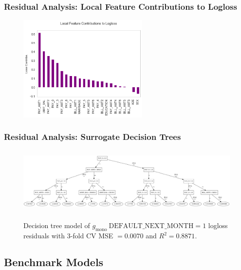 \documentclass[11pt,
               aspectratio=43,
               hyperref={colorlinks}
               ]{beamer}
\begin{document}
			\begin{frame}
		
				\frametitle{\textbf{Residual Analysis}: Local Feature Contributions to Logloss}
		
				\begin{figure}[htb]
					\begin{center}
						\includegraphics[height=150pt]{img/local.png}
					\end{center}
				\end{figure}	
		
			\end{frame}

			\begin{frame}
		
				\frametitle{\textbf{Residual Analysis}: Surrogate Decision Trees}
				\begin{figure}[htb]
					\begin{center}
						\includegraphics[height=95pt, width=330pt]{img/surrogate_dt_1.png}
					\end{center}
				\vspace{10pt}
				\footnotesize{Decision tree model of $g_{\text{mono}} ~\text{DEFAULT\_NEXT\_MONTH} =1$ logloss residuals with 3-fold CV MSE $=0.0070$ and $R^2=0.8871$}.
				\end{figure}	
		
			\end{frame}
			
		\subsection{Benchmark Models}
\end{document}
